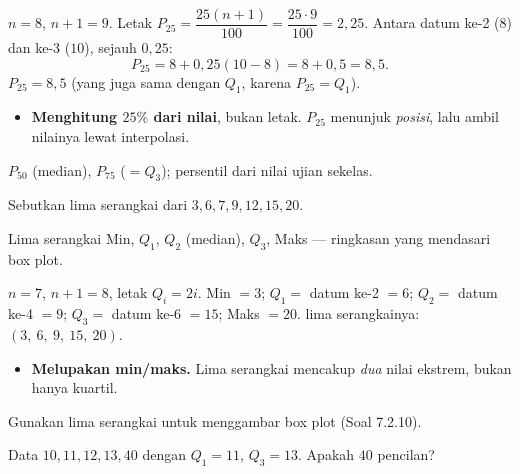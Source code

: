 \jawab
{} $n=8$, $n+1=9$. Letak $P_{25}=\dfrac{25(n+1)}{100}=\dfrac{25\cdot9}{100}
=2{,}25$.
 Antara datum ke-2 ($8$) dan ke-3 ($10$), sejauh $0{,}25$:
\[
P_{25}=8+0{,}25(10-8)=8+0{,}5=8{,}5.
\]
\jadi $P_{25}=8{,}5$ (yang juga sama dengan $Q_1$, karena $P_{25}=Q_1$).

\begin{jebakan}
\begin{itemize}[leftmargin=*,topsep=2pt]
  \item \textbf{Menghitung $25\%$ dari nilai}, bukan letak. $P_{25}$ menunjuk
  \emph{posisi}, lalu ambil nilainya lewat interpolasi.
\end{itemize}
\end{jebakan}

\begin{variasi}
$P_{50}$ (median), $P_{75}$ ($=Q_3$); persentil dari nilai ujian sekelas.
\end{variasi}

\begin{soalbox}{}
Sebutkan lima serangkai dari $3,6,7,9,12,15,20$.
\end{soalbox}

\begin{ingat}{Lima serangkai}
Min, $Q_1$, $Q_2$ (median), $Q_3$, Maks --- ringkasan yang mendasari box plot.
\end{ingat}

\jawab
{} $n=7$, $n+1=8$, letak $Q_i=2i$.
 Min $=3$; $Q_1=$ datum ke-2 $=6$; $Q_2=$ datum ke-4 $=9$;
$Q_3=$ datum ke-6 $=15$; Maks $=20$.
\jadi lima serangkainya: $(3,\ 6,\ 9,\ 15,\ 20)$.

\begin{jebakan}
\begin{itemize}[leftmargin=*,topsep=2pt]
  \item \textbf{Melupakan min/maks.} Lima serangkai mencakup \emph{dua} nilai
  ekstrem, bukan hanya kuartil.
\end{itemize}
\end{jebakan}

\begin{variasi}
Gunakan lima serangkai untuk menggambar box plot (Soal 7.2.10).
\end{variasi}

\begin{soalbox}{}
Data $10,11,12,13,40$ dengan $Q_1=11$, $Q_3=13$. Apakah $40$ pencilan?
\end{soalbox}

